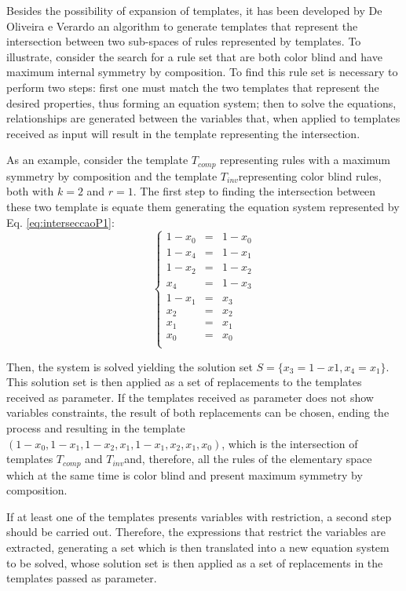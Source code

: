 \documentclass{llncs}
\begin{document}
Besides the possibility of expansion of templates, it has been developed by De Oliveira e Verardo \cite{deOliveira2014b} an algorithm to generate templates that represent the intersection between two sub-spaces of rules represented by templates. To illustrate, consider the search for a rule set that are both color blind and have maximum internal symmetry by composition. To find this rule set is necessary to perform two steps: first one must match the two templates that represent the desired properties, thus forming an equation system; then to solve the equations, relationships are generated between the variables that, when applied to templates received as input will result in the template representing the intersection.

As an example, consider the template $T_{comp}$ representing rules with a maximum symmetry by composition and the template $T_{inv}$representing color blind rules, both with $k=2$ and $r=1$. The first step to finding the intersection between these two template is equate them generating the equation system represented by Eq. \ref{eq:interseccaoP1}:
\begin{equation}
\left\{\begin{matrix}
1 - x_0 & = & 1 - x_0 \\
1 - x_4 & = & 1 - x_1 \\
1 - x_2 & = & 1 - x_2 \\
x_4   & = & 1 - x_3 \\
1 - x_1 & = & x_3   \\
x_2   & = & x_2   \\
x_1   & = & x_1   \\
x_0   & = & x_0   \\
\end{matrix}\right.
\label{eq:interseccaoP1}
\end{equation}

Then, the system is solved yielding the solution set $S = \{x_3 = 1-x1, x_4 = x_1\}$. This solution set is then applied as a set of replacements to the templates received as parameter. If the templates received as parameter does not show variables constraints, the result of both replacements can be chosen, ending the process and resulting in the template $(1 - x_0, 1 - x_1, 1 - x_2, x_1, 1 - x_1, x_2, x_1, x_0)$, which is the intersection of templates $T_{comp}$ and $T_{inv}$and, therefore, all the rules of the elementary space which at the same time is color blind and present maximum symmetry by composition.

If at least one of the templates presents variables with restriction, a second step should be carried out. Therefore, the expressions that restrict the variables are extracted, generating a set which is then translated into a new equation system to be solved, whose solution set is then applied as a set of replacements in the templates passed as parameter.
\end{document}
